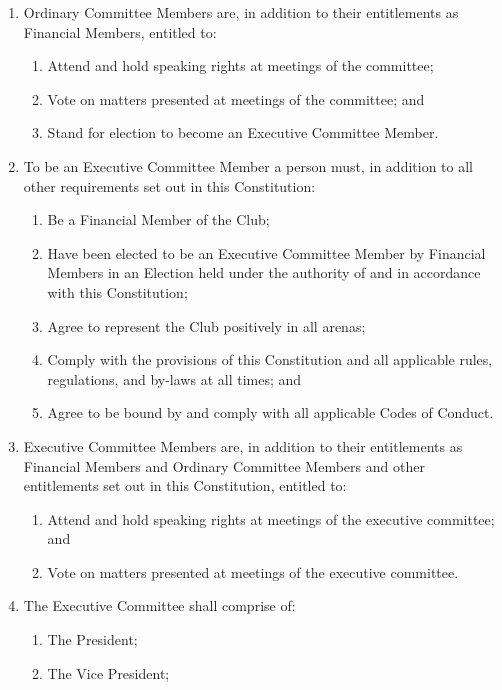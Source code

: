 \documentclass[12pt]{article}
\begin{document}
\begin{enumerate}[label=4.\arabic*]
    \item Ordinary Committee Members are, in addition to their entitlements as Financial Members, entitled to:
    \begin{enumerate}[label=\theenumi.\arabic*]
        \item Attend and hold speaking rights at meetings of the committee;
        \item Vote on matters presented at meetings of the committee; and
        \item Stand for election to become an Executive Committee Member.
    \end{enumerate}
    \item To be an Executive Committee Member a person must, in addition to all other requirements set out in this Constitution:
    \begin{enumerate}[label=\theenumi.\arabic*]
        \item Be a Financial Member of the Club;
        \item Have been elected to be an Executive Committee Member by Financial Members in an Election held under the authority of and in accordance with this Constitution;
        \item Agree to represent the Club positively in all arenas;
        \item Comply with the provisions of this Constitution and all applicable rules, regulations, and by-laws at all times; and
        \item Agree to be bound by and comply with all applicable Codes of Conduct.
    \end{enumerate}
    \item Executive Committee Members are, in addition to their entitlements as Financial Members and Ordinary Committee Members and other entitlements set out in this Constitution, entitled to:
    \begin{enumerate}[label=\theenumi.\arabic*]
        \item Attend and hold speaking rights at meetings of the executive committee; and
        \item Vote on matters presented at meetings of the executive committee.
    \end{enumerate}
    \item The Executive Committee shall comprise of:
    \begin{enumerate}[label=\theenumi.\arabic*]
        \item The President;
        \item The Vice President;

\end{enumerate}
\end{enumerate}
\end{document}
